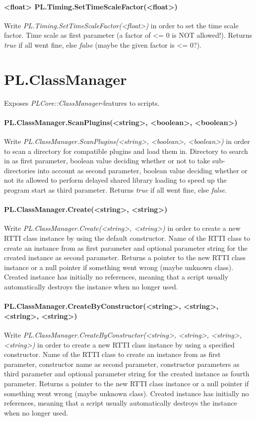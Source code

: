 \paragraph{<float> PL.Timing.SetTimeScaleFactor(<float>)}
Write \emph{PL.Timing.SetTimeScaleFactor(<float>)} in order to set the time scale factor. Time scale as first parameter (a factor of <= 0 is NOT allowed!). Returns \emph{true} if all went fine, else \emph{false} (maybe the given factor is <= 0?).




\section{PL.ClassManager}
Exposes \emph{PLCore::ClassManager}-features to scripts.

\paragraph{PL.ClassManager.ScanPlugins(<string>, <boolean>, <boolean>)}
Write \emph{PL.ClassManager.ScanPlugins(<string>, <boolean>, <boolean>)} in order to scan a directory for compatible plugins and load them in. Directory to search in as first parameter, boolean value deciding whether or not to take sub-directories into account as second parameter, boolean value deciding whether or not its allowed to perform delayed shared library loading to speed up the program start as third parameter. Returns \emph{true} if all went fine, else \emph{false}.

\paragraph{PL.ClassManager.Create(<string>, <string>)}
Write \emph{PL.ClassManager.Create(<string>, <string>)} in order to create a new RTTI class instance by using the default constructor. Name of the RTTI class to create an instance from as first parameter and optional parameter string for the created instance as second parameter. Returns a pointer to the new RTTI class instance or a null pointer if something went wrong (maybe unknown class). Created instance has initially no references, meaning that a script usually automatically destroys the instance when no longer used.

\paragraph{PL.ClassManager.CreateByConstructor(<string>, <string>, <string>, <string>)}
Write \emph{PL.ClassManager.CreateByConstructor(<string>, <string>, <string>, <string>)} in order to create a new RTTI class instance by using a specified constructor. Name of the RTTI class to create an instance from as first parameter, constructor name as second parameter, constructor parameters as third parameter and optional parameter string for the created instance as fourth parameter. Returns a pointer to the new RTTI class instance or a null pointer if something went wrong (maybe unknown class). Created instance has initially no references, meaning that a script usually automatically destroys the instance when no longer used.
